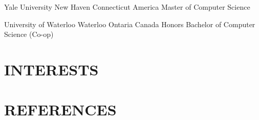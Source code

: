 \documentclass[11pt, a4paper]{moderncv}
\begin{document}
    {Yale University}
    {New Haven}
    {Connecticut}
    {America}
    {Master of Computer Science}

    {University of Waterloo}
    {Waterloo}
    {Ontaria}
    {Canada}
    {Honors Bachelor of Computer Science (Co-op)}


\section{INTERESTS}

\section{REFERENCES}
\end{document}
